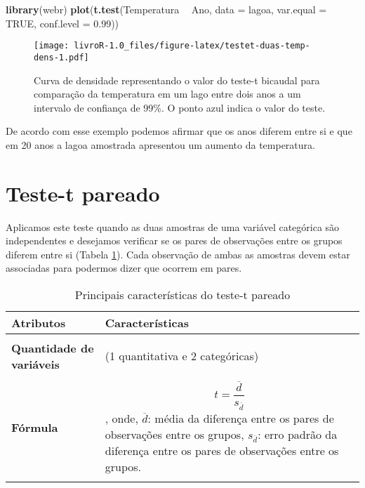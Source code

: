 \documentclass[titlepage, oneside, openany, a4paper]{book}
\newenvironment{Shaded}{\begin{snugshade}}{\end{snugshade}}
\newcommand{\DataTypeTok}[1]{\textcolor[rgb]{0.13,0.29,0.53}{#1}}
\newcommand{\FloatTok}[1]{\textcolor[rgb]{0.00,0.00,0.81}{#1}}
\newcommand{\KeywordTok}[1]{\textcolor[rgb]{0.13,0.29,0.53}{\textbf{#1}}}
\newcommand{\NormalTok}[1]{#1}
\newcommand{\OperatorTok}[1]{\textcolor[rgb]{0.81,0.36,0.00}{\textbf{#1}}}
\newcommand{\OtherTok}[1]{\textcolor[rgb]{0.56,0.35,0.01}{#1}}
\newcommand{\StringTok}[1]{\textcolor[rgb]{0.31,0.60,0.02}{#1}}
\begin{document}
\begin{Shaded}
\begin{Highlighting}[]
\KeywordTok{library}\NormalTok{(webr)}
\KeywordTok{plot}\NormalTok{(}\KeywordTok{t.test}\NormalTok{(Temperatura }\OperatorTok{~}\StringTok{ }\NormalTok{Ano, }
            \DataTypeTok{data =}\NormalTok{ lagoa,}
            \DataTypeTok{var.equal =} \OtherTok{TRUE}\NormalTok{,}
            \DataTypeTok{conf.level =} \FloatTok{0.99}\NormalTok{))}
\end{Highlighting}
\end{Shaded}

\begin{figure}
\centering
\texttt{[image: livroR-1.0\_files/figure-latex/testet-duas-temp-dens-1.pdf]}
\caption{\label{fig:testet-duas-temp-dens}Curva de densidade representando o valor do teste-t bicaudal para comparação da temperatura em um lago entre dois anos a um intervalo de confiança de 99\%. O ponto azul indica o valor do teste.}
\end{figure}

De acordo com esse exemplo podemos afirmar que os anos diferem entre si e que em 20 anos a lagoa amostrada apresentou um aumento da temperatura.

\hypertarget{teste-t-pareado}{%
\section{Teste-t pareado}\label{teste-t-pareado}}

Aplicamos este teste quando as duas amostras de uma variável categórica são independentes e desejamos verificar se os pares de observações entre os grupos diferem entre si (Tabela \ref{tab:tab3t}). Cada observação de ambas as amostras devem estar associadas para podermos dizer que ocorrem em pares.

\begin{table}

\caption{\label{tab:tab3t}Principais características do teste-t pareado}
\centering
\begin{tabular}[c]{>{\raggedright\arraybackslash}p{10em}>{\raggedright\arraybackslash}p{30em}}
\toprule
Atributos & Características\\
\midrule
\textbf{\cellcolor{gray!6}{Tipo de variável}} & \cellcolor{gray!6}{Quantitativa e categórica}\\
\textbf{Quantidade de variáveis} & 3 (1 quantitativa e 2 categóricas)\\
\textbf{\cellcolor{gray!6}{Hipótese nula}} & \cellcolor{gray!6}{A diferença na média da variável quantitativa entre os pares de grupos é igual a 0.}\\
\textbf{Fórmula} & $$t=\frac{\overline{d}}{s_{\overline{d}}}$$, onde, $\overline{d}$: média da diferença entre os pares de observações entre os grupos, $s_{\overline{d}}$: erro padrão da diferença entre os pares de observações entre os grupos.\\
\textbf{\cellcolor{gray!6}{Observação}} & \cellcolor{gray!6}{Não há a necessidade de post-hoc nem expressa-la graficamente.}\\
\bottomrule
\end{tabular}
\end{table}
\end{document}
